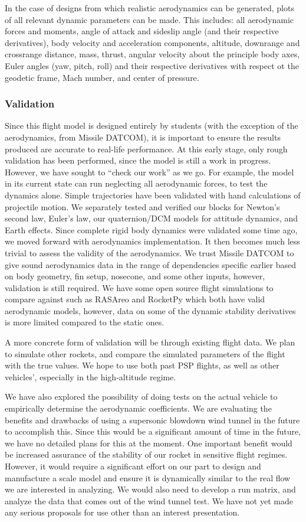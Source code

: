 In the case of designs from which realistic aerodynamics can be generated, plots of all relevant dynamic parameters can be made. This includes: all aerodynamic forces and moments, angle of attack and sideslip angle (and their respective derivatives), body velocity and acceleration components, altitude, downrange and crossrange distance, mass, thrust, angular velocity about the principle body axes, Euler angles (yaw, pitch, roll) and their respective derivatives with respect ot the geodetic frame, Mach number, and center of pressure.

\subsubsection{Validation}
Since this flight model is designed entirely by students (with the exception of the aerodynamics, from Missile DATCOM), it is important to ensure the results produced are accurate to real-life performance. At this early stage, only rough validation has been performed, since the model is still a work in progress. However, we have sought to ``check our work'' as we go. For example, the model in its current state can run neglecting all aerodynamic forces, to test the dynamics alone. Simple trajectories have been validated with hand calculations of projectile motion. We separately tested and verified our blocks for Newton's second law, Euler’s law, our quaternion/DCM models for attitude dynamics, and Earth effects. Since complete rigid body dynamics were validated some time ago, we moved forward with aerodynamics implementation. It then becomes much less trivial to assess the validity of the aerodynamics. We trust Missile DATCOM to give sound aerodynamics data in the range of dependencies specific earlier based on body geometry, fin setup, nosecone, and some other inputs, however, validation is still required. We have some open source flight simulations to compare against such as RASAreo and RocketPy which both have valid aerodynamic models, however, data on some of the dynamic stability derivatives is more limited compared to the static ones.

A more concrete form of validation will be through existing flight data. We plan to simulate other rockets, and compare the simulated parameters of the flight with the true values. We hope to use both past PSP flights, as well as other vehicles', especially in the high-altitude regime. 

We have also explored the possibility of doing tests on the actual vehicle to empirically determine the aerodynamic coefficients. We are evaluating the benefits and drawbacks of using a supersonic blowdown wind tunnel in the future to accomplish this. Since this would be a significant amount of time in the future, we have no detailed plans for this at the moment. One important benefit would be increased assurance of the stability of our rocket in sensitive flight regimes. However, it would require a significant effort on our part to design and manufacture a scale model and ensure it is dynamically similar to the real flow we are interested in analyzing. We would also need to develop a run matrix, and analyze the data that comes out of the wind tunnel test. We have not yet made any serious proposals for use other than an interest presentation.

